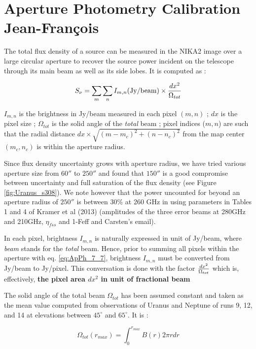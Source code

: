 \section{Aperture Photometry Calibration {\color{green} Jean-Fran\c cois}}

The total flux density of a source can be measured in the NIKA2 image
over a large circular aperture to recover  the source power incident on the telescope  through its main
beam as well as its side lobes. It is computed as :

\begin{equation}
S_{\nu} = \sum_{m} \sum_{n}  I_{m,n} ({\rm Jy/beam}) \times {dx^2 \over {\Omega_{tot}}}
\label{eq:ApPh_7_7}
\end{equation}

\noindent  $I_{m,n}$ is the brightness in Jy/beam measured in each pixel $(m,n)$  ; $dx$ is the pixel size ;
$\Omega_{tot}$ is the solid angle of the {\it total} beam ; pixel
indices ($m,n$) are such that the radial distance $dx \times \sqrt{(m-m_c)^2 + (n-n_c)^2}$ from the map center $(m_c,n_c)$
is within the aperture radius. 

Since flux density uncertainty grows with aperture radius, we have tried various aperture size from $60''$
to $250''$ and found that $150''$  is  a good compromise between  uncertainty and full saturation of the flux density (see Figure \ref{fig:Uranus_s308}). 
We note however that the power uncounted for beyond an aperture radius of $250''$ is between 30\% at 260 GHz 
in using parameters in Tables 1 and 4 of Kramer et al
(2013) (amplitudes of the three error beams at 280GHz and 210GHz, $\eta_{fss}$ and 1-Feff and Carsten's email).

In each pixel, brightness $I_{m,n}$ is naturally expressed in unit of
Jy/beam, where  {\it beam} stands for the {\it total} beam.
Hence, prior to summing all pixels within the aperture with eq. \ref{eq:ApPh_7_7}, brightness $I_{m,n}$
must be converted from  Jy/beam to Jy/pixel. This
conversation is done with the factor $dx^2 \over {\Omega_{tot}}$
which is, effectively, {\bf the pixel area $dx^2$  in unit of fractional beam}

The solid angle of the total beam $\Omega_{tot}$ has been assumed constant and taken as the mean value 
computed from observations of Uranus and Neptune of runs 9, 12, and 14 at elevations between $45^{\circ}$ and $65^{\circ}$. It is : 

\begin{equation}
 \Omega_{tot} (r_{max}) = \int_0^{r_{max}} B(r) 2 \pi r dr
\label{eq:Otrue}
\end{equation}

